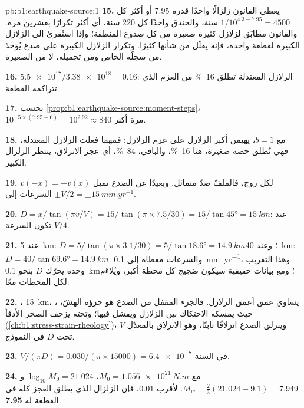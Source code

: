 \begin{solution}{pb:b1:earthquake-source:1}
\textbf{15.} يعطي القانون زلزالًا واحدًا قدره 7.95 أو أكثر كل
$1/10^{4.3 - 7.95} = \num{4500}$ سنة، والخندق واحدًا كل 220 سنة، أي أكثر تكرارًا بعشرين مرة. والقانون مطابَق لزلازل كثيرة صغيرة من كل صدوع المنطقة؛ وإذا استُقرئ إلى الزلازل الكبيرة لقطعة واحدة، فإنه يقلّل من شأنها كثيرًا. وتكرار الزلازل الكبيرة على صدع يُؤخذ من سجلّه الخاص ومن تحميله، لا من الصغيرة.

\textbf{16.} $\num{5.5e17}/\num{3.38e18} = 0.16$: الزلازل المعتدلة
تطلق \qty{16}{\percent} من العزم الذي تتراكمه القطعة.

\textbf{17.} بحسب \cref{prop:b1:earthquake-source:moment-steps}،
$10^{1.5\times(7.95 - 6)} = 10^{2.92} \approx 840$ مرة أكثر.

\textbf{18.} مع $b = 1$، يهيمن أكبر الزلازل على عزم الزلازل: فمهما فعلت الزلازل المعتدلة، فهي تُطلق حصة صغيرة، هنا \qty{16}{\percent}، والباقي، \qty{84}{\percent}، أي عجز الانزلاق، ينتظر الزلزال الكبير.

\textbf{19.} $v(-x) = -v(x)$ لكل زوج، فالملفّ ضدّ متماثل. وبعيدًا عن الصدع تميل السرعات إلى $\pm V/2 = \pm\qty{15}{mm.yr^{-1}}$.

\textbf{20.} $D = x/\tan(\pi v/V) = 15/\tan(\pi\times7.5/30) = 15/\tan\ang{45} =
\qty{15}{km}$: عند  تكون السرعة $V/4$.

\textbf{21.} عند \qty{5}{km}: $D = 5/\tan(\pi\times3.1/30) = 5/\tan\ang{18.6} =
\qty{14.9}{km}$؛ وعند \qty{40}{km}: $D = 40/\tan\ang{69.6} = \qty{14.9}{km}$. والسرعات معطاة إلى \qty{0.1}{mm.yr^{-1}}، وهذا التقريب وحده يحرّك $D$ بنحو \qty{0.1}{km}؛ ومع بيانات حقيقية سيكون ضجيج كل محطة أكبر، ويُلاءَم  لكل المحطات معًا.

\textbf{22.} ، \qty{15}{km}، يساوي عمق أعمق الزلازل. فالجزء المقفل من الصدع هو جزؤه الهشّ، ، حيث يمسكه الاحتكاك بين الزلازل ويفشل فيها؛ وتحته يزحف الصخر الأدفأ (\cref{ch:b1:stress-strain-rheology})، وينزلق الصدع انزلاقًا ثابتًا، وهو الانزلاق بالمعدّل $V$ تحت $D$ في النموذج.

\textbf{23.} $V/(\pi D) = \num{0.030}/(\pi\times\num{15000}) = \num{6.4e-7}$
في السنة.

\textbf{24.} مع $M_0 = \qty{1.056e21}{N.m}$، $\log_{10}M_0 = 21.024$ و
$M_w = \tfrac23(21.024 - 9.1) = 7.949$. لأقرب 0.01، فإن الزلزال الذي يطلق العجز كله في القطعة له 
\textbf{7.95}.
\end{solution}
